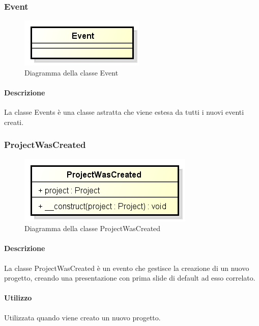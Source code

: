 \subsubsection{Event}
\begin{figure}[h]
	\centering
	\includegraphics[width=0.5\linewidth]{img/premi_back_end_event}
	\caption[Diagramma della classe Event]{Diagramma della classe Event}
	\label{fig:premi_back_end_event}
\end{figure}


\paragraph{Descrizione}
La classe Events è una classe astratta che viene estesa da tutti i nuovi eventi creati.

\newpage
\subsubsection{ProjectWasCreated}
\begin{figure}[h]
	\centering
	\includegraphics[width=0.5\linewidth]{img/premi_back_end_project_was_created}
	\caption[Diagramma della classe ProjectWasCreated]{Diagramma della classe ProjectWasCreated}
	\label{fig:premi_back_end_project_was_created}
\end{figure}


\paragraph{Descrizione}
La classe ProjectWasCreated è un evento che gestisce la creazione di un nuovo progetto, creando una presentazione con prima \gls{slide} di default ad esso correlato.

\paragraph{Utilizzo}
Utilizzata quando viene creato un nuovo progetto.

